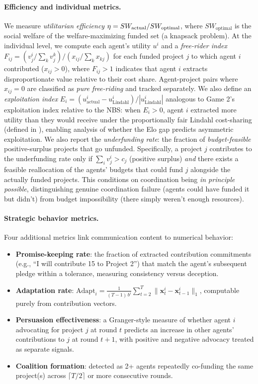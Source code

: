 \paragraph{Efficiency and individual metrics.}
We measure \emph{utilitarian efficiency} $\eta = \\ SW_{\text{actual}} / SW_{\text{optimal}}$, where $SW_{\text{optimal}}$ is the social welfare of the welfare-maximizing funded set (a knapsack problem).
At the individual level, we compute each agent's utility $u^i$ and a \emph{free-rider index} $F_{ij} = (v^i_j / \sum_k v^k_j) / (x_{ij} / \sum_k x_{kj})$ for each funded project $j$ to which agent $i$ contributed ($x_{ij} > 0$), where $F_{ij} > 1$ indicates that agent $i$ extracts disproportionate value relative to their cost share.
Agent-project pairs where $x_{ij} = 0$ are classified as \emph{pure free-riding} and tracked separately.
We also define an \emph{exploitation index} $E_i = (u^i_{\text{actual}} - u^i_{\text{Lindahl}}) / |u^i_{\text{Lindahl}}|$ analogous to Game 2's exploitation index relative to the NBS: when $E_i > 0$, agent $i$ extracted more utility than they would receive under the proportionally fair Lindahl cost-sharing (defined in ), enabling analysis of whether the Elo gap predicts asymmetric exploitation.
We also report the \emph{underfunding rate}: the fraction of \emph{budget-feasible} positive-surplus projects that go unfunded.
Specifically, a project $j$ contributes to the underfunding rate only if $\sum_i v^i_j > c_j$ (positive surplus) \emph{and} there exists a feasible reallocation of the agents' budgets that could fund $j$ alongside the actually funded projects.
This conditions on coordination being \emph{in principle possible}, distinguishing genuine coordination failure (agents could have funded it but didn't) from budget impossibility (there simply weren't enough resources).

\paragraph{Strategic behavior metrics.}
Four additional metrics link communication content to numerical behavior:
\begin{itemize}
    \item \textbf{Promise-keeping rate}: the fraction of extracted contribution commitments (e.g., ``I will contribute 15 to Project 2'') that match the agent's subsequent pledge within a tolerance, measuring consistency versus deception.
    \item \textbf{Adaptation rate}: $\text{Adapt}_i = \frac{1}{(T-1)\,b^i} \sum_{t=2}^{T} \|\bm{x}^i_t - \bm{x}^i_{t-1}\|_1$, computable purely from contribution vectors.
    \item \textbf{Persuasion effectiveness}: a Granger-style measure of whether agent $i$ advocating for project $j$ at round $t$ predicts an increase in other agents' contributions to $j$ at round $t+1$, with positive and negative advocacy treated as separate signals.
    \item \textbf{Coalition formation}: detected as 2+ agents repeatedly co-funding the same project(s) across $\lceil T/2 \rceil$ or more consecutive rounds.
\end{itemize}

